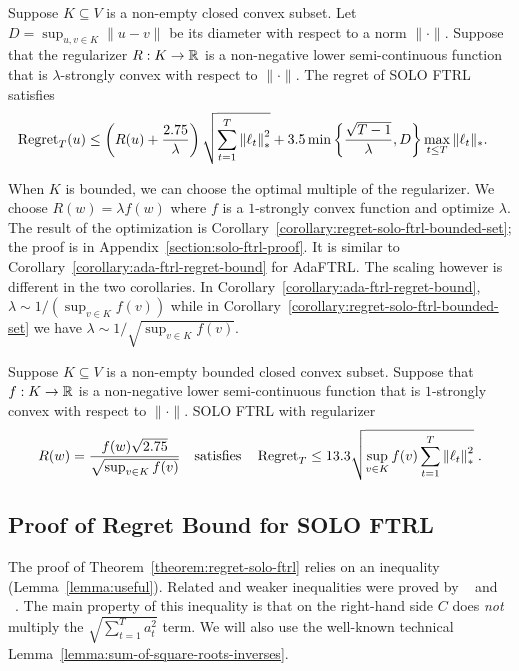 \begin{theorem}
\label{theorem:regret-solo-ftrl}
Suppose $K \subseteq V$ is a non-empty closed convex subset.  Let $D =
\sup_{u,v \in K} \|u - v\|$ be its diameter with respect to a norm $\|\cdot\|$.
Suppose that the regularizer $R:K \to \mathbb{R}$ is a non-negative lower
semi-continuous function that is $\lambda$-strongly convex with respect to
$\|\cdot\|$. The regret of SOLO FTRL satisfies
\begin{align*}
\operatorname{Regret}_T(u)
& \le \left( R(u) + \frac{2.75}{\lambda}\right) \sqrt{\sum_{t=1}^{T} {\left\|{\ell_t}\right\|}_*^2}
+ 3.5 \min\left\{\frac{\sqrt{T-1}}{\lambda} , D\right\} \max_{t \le T} \|\ell_t\|_*.
\end{align*}
\end{theorem}

When $K$ is bounded, we can choose the optimal multiple of the regularizer.  We
choose $R(w) = \lambda f(w)$ where $f$ is a $1$-strongly convex function and
optimize $\lambda$.  The result of the optimization is
Corollary~\ref{corollary:regret-solo-ftrl-bounded-set}; the proof is in
Appendix~\ref{section:solo-ftrl-proof}.  It is similar to
Corollary~\ref{corollary:ada-ftrl-regret-bound} for AdaFTRL. The scaling
however is different in the two corollaries.  In
Corollary~\ref{corollary:ada-ftrl-regret-bound}, $\lambda \sim 1/(\sup_{v \in
K} f(v))$ while in Corollary~\ref{corollary:regret-solo-ftrl-bounded-set} we
have $\lambda \sim 1/\sqrt{\sup_{v \in K} f(v)}$.

\begin{corollary}
\label{corollary:regret-solo-ftrl-bounded-set}
Suppose $K \subseteq V$ is a non-empty bounded closed convex subset.  Suppose
that $f:K \to \mathbb{R}$ is a non-negative lower semi-continuous function that is $1$-strongly
convex with respect to $\|\cdot\|$. SOLO FTRL with regularizer
$$
R(w) = \frac{f(w)\sqrt{2.75}}{\sqrt{\sup_{v \in K} f(v)}}
\quad \text{satisfies} \quad %
\Regret_T \le 13.3 \sqrt{\sup_{v \in K} f(v) \sum_{t=1}^{T} \norm{\ell_t}_*^2} \; .
$$
\end{corollary}

\subsection{Proof of Regret Bound for SOLO FTRL}
\label{section:solo-ftrl-regret-bound}

The proof of Theorem~\ref{theorem:regret-solo-ftrl} relies on an inequality
(Lemma~\ref{lemma:useful}).  Related and weaker inequalities were proved by
~\cite{Auer-Cesa-Bianchi-Gentile-2002} and ~\cite{Jaksch-Ortner-Auer-2010}.
The main property of this inequality is that on the right-hand side $C$ does
\emph{not} multiply the $\sqrt{\sum_{t=1}^T a_t^2}$ term.  We will also use the
well-known technical Lemma~\ref{lemma:sum-of-square-roots-inverses}.

